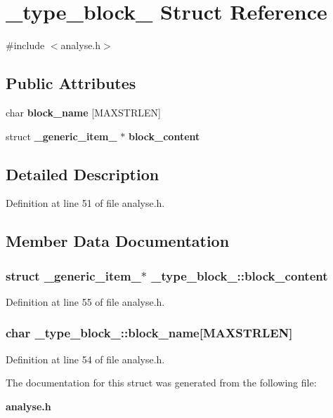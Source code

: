 \section{\_\-type\_\-block\_\- Struct Reference}
\label{struct__type__block__}


{\ttfamily \#include $<$analyse.h$>$}\subsection*{Public Attributes}
\begin{DoxyCompactItemize}
\item 
char {\bf block\_\-name} [MAXSTRLEN]
\item 
struct {\bf \_\-generic\_\-item\_\-} $\ast$ {\bf block\_\-content}
\end{DoxyCompactItemize}


\subsection{Detailed Description}


Definition at line 51 of file analyse.h.

\subsection{Member Data Documentation}
\subsubsection[{block\_\-content}]{\setlength{\rightskip}{0pt plus 5cm}struct {\bf \_\-generic\_\-item\_\-}$\ast$ {\bf \_\-type\_\-block\_\-::block\_\-content}\hspace{0.3cm}{\ttfamily  [read]}}\label{struct__type__block___a85da2291e1fe11627ceeb2eede0501a3}


Definition at line 55 of file analyse.h.
\subsubsection[{block\_\-name}]{\setlength{\rightskip}{0pt plus 5cm}char {\bf \_\-type\_\-block\_\-::block\_\-name}[MAXSTRLEN]}\label{struct__type__block___a2cedecc4602de156f0226057a759d038}


Definition at line 54 of file analyse.h.

The documentation for this struct was generated from the following file:\begin{DoxyCompactItemize}
\item 
{\bf analyse.h}\end{DoxyCompactItemize}
